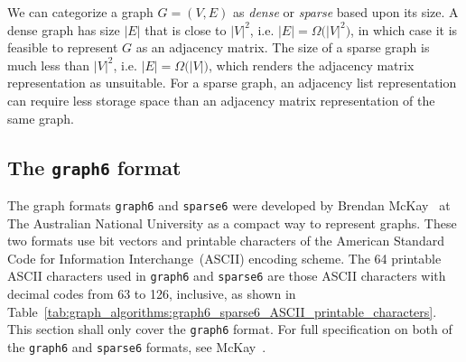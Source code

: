 We can categorize a graph $G = (V, E)$ as \emph{dense} or
\emph{sparse} based upon its size. A dense graph
has size $|E|$ that is close to $|V|^2$, i.e.
$|E| = \Omega\big(|V|^2\big)$, in which case it is feasible to
represent $G$ as an adjacency matrix. The size of a sparse
graph is much less than $|V|^2$, i.e.
$|E| = \Omega\big(|V|\big)$, which renders the adjacency matrix
representation as unsuitable. For a sparse graph, an adjacency list
representation can require less storage space than an adjacency matrix
representation of the same graph.



\subsection{The {\tt graph6} format}
\label{sec:graph_algorithms:graph6_format}

The graph formats {\tt graph6} and {\tt sparse6} were developed by Brendan
McKay~\cite{McKay2010} at The Australian National University as a
compact way to represent graphs. These two formats use bit vectors and
printable characters of the American Standard Code for Information
Interchange~(ASCII) encoding scheme. The 64 printable ASCII characters
used in {\tt graph6} and {\tt sparse6} are those ASCII characters with decimal
codes from 63 to 126, inclusive, as shown in
Table~\ref{tab:graph_algorithms:graph6_sparse6_ASCII_printable_characters}.
This section shall only cover the {\tt graph6} format. For full
specification on both of the {\tt graph6} and {\tt sparse6} formats, see
McKay~\cite{McKay2010}.

